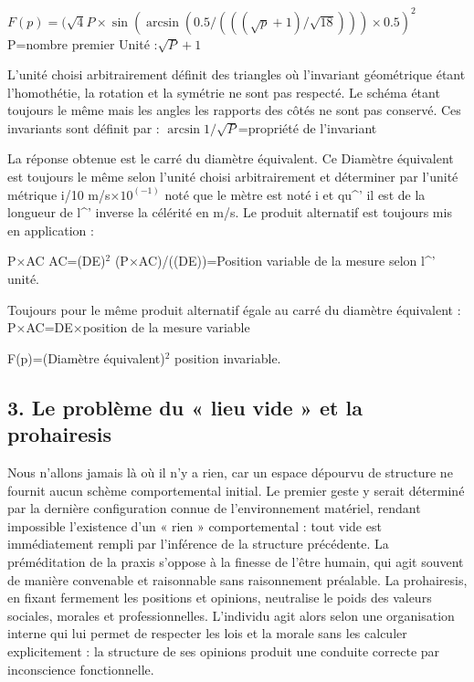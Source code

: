 \documentclass[12pt,a4paper]{article}
\begin{document}
$F(p)=(\sqrt{4}P\times\sin(\arcsin(0.5/(((\sqrt{p}+1)/\sqrt{18})) )\times0.5)^2$
P=nombre premier
Unité :$\sqrt{P}+1$

L’unité choisi arbitrairement définit des triangles où l’invariant géométrique étant l’homothétie, la rotation et la symétrie ne sont pas respecté. Le schéma étant toujours le même mais les angles les rapports des côtés ne sont pas conservé. Ces invariants sont définit par :
$\arcsin 1/\sqrt{P}$=propriété de l'invariant

La réponse obtenue est le carré du diamètre équivalent.
Ce Diamètre équivalent est toujours le même selon l’unité choisi arbitrairement et déterminer par l’unité métrique
i/10  m/s×$10^{(-1)}$ noté que le mètre est noté i et qu\textasciicircum{}' il est de la longueur de
l\textasciicircum{}' inverse la célérité en m/s.
Le produit alternatif est toujours mis en application :

P×AC
AC=(DE)$^2$
(P×AC)/((DE))=Position variable de la mesure selon l\textasciicircum{}' unité.

Toujours pour le même produit alternatif égale au carré du diamètre équivalent :
P×AC=DE×position de la mesure variable

F(p)=(Diamètre équivalent)$^2$ position invariable.

\subsection*{3. Le problème du « lieu vide » et la prohairesis}
Nous n’allons jamais là où il n’y a rien, car un espace dépourvu de structure ne fournit aucun schème comportemental initial. Le premier geste y serait déterminé par la dernière configuration connue de l’environnement matériel, rendant impossible l’existence d’un « rien » comportemental : tout vide est immédiatement rempli par l’inférence de la structure précédente.
La préméditation de la praxis s’oppose à la finesse de l’être humain, qui agit souvent de manière convenable et raisonnable sans raisonnement préalable. La prohairesis, en fixant fermement les positions et opinions, neutralise le poids des valeurs sociales, morales et professionnelles. L’individu agit alors selon une organisation interne qui lui permet de respecter les lois et la morale sans les calculer explicitement : la structure de ses opinions produit une conduite correcte par inconscience fonctionnelle.
\end{document}

